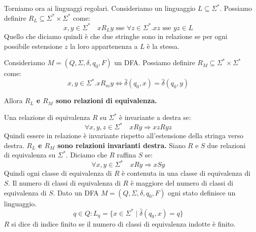 \documentclass[a4paper]{article}
\begin{document}
\noindent
Torniamo ora ai linguaggi regolari.
Consideriamo un linguaggio $L \subseteq \Sigma^*$.
Possiamo definire $R_L \subseteq \Sigma^* \times \Sigma^*$ come:
\[x,y \in \Sigma^* \quad xR_Ly \text{ sse } \forall z \in \Sigma^* . xz \text { sse } yz \in L\]
Quello che diciamo quindi è che due stringhe sono in relazione se per ogni possibile estensione $z$
la loro appartenenza a $L$ è la stessa.
{
  Consideriamo $M = (Q, \Sigma, \delta, q_0, F)$ un DFA. Possiamo definire
  $R_M \subseteq \Sigma^* \times \Sigma^*$ come:
  \[x,y \in \Sigma^* . xR_my \Longleftrightarrow \hat{\delta}(q_0, x) = \hat{\delta}(q_0,y)\]
  \begin{figure}[H]
    \centering
  \end{figure}
  \noindent
  Allora \textbf{$R_L$ e $R_M$ sono relazioni di equivalenza.}
}
{
  Una relazione di equivalenza $R$ su $\Sigma^*$ è invariante a destra se:
  \[\forall x,y,z \in \Sigma^* \quad xRy \Rightarrow xzRyz\]
  Quindi essere in relazione è invariante rispetto all'estensione della stringa verso destra.
  \textbf{$R_L$ e $R_M$ sono relazioni invarianti destra.}
}
{
  Siano $R$ e $S$ due relazioni di equivalenza su $\Sigma^*$.
  Diciamo che $R$ raffina $S$ se:
  \[\forall x,y \in \Sigma^* \quad xRy \Rightarrow xSy\]
  Quindi ogni classe di equivalenza di $R$ è contenuta in una classe di equivalenza di $S$.
  Il numero di classi di equivalenza di $R$ è maggiore del numero di classi di equivalenza di $S$.
}
\dfn{}
{
  Dato un DFA $M = (Q, \Sigma, \delta, q_0, F)$ ogni
  stato definisce un linguaggio.
  \[q \in Q : L_q = \{x \in \Sigma^* \; | \; \hat{\delta}(q_0, x) = q\}\]
}
\noindent
$R$ si dice di indice finito se il numero di classi di equivalenza indotte è finito.
\end{document}
